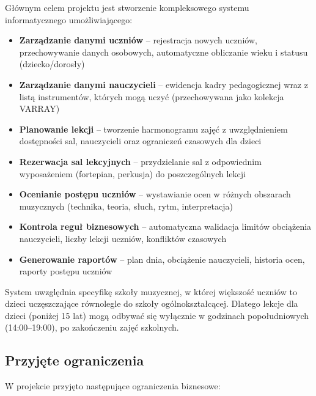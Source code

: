 \documentclass[12pt,a4paper]{article}
\begin{document}
Głównym celem projektu jest stworzenie kompleksowego systemu informatycznego umożliwiającego:

\begin{itemize}
    \item \textbf{Zarządzanie danymi uczniów} -- rejestracja nowych uczniów, przechowywanie danych osobowych, automatyczne obliczanie wieku i statusu (dziecko/dorosły)

    \item \textbf{Zarządzanie danymi nauczycieli} -- ewidencja kadry pedagogicznej wraz z listą instrumentów, których mogą uczyć (przechowywana jako kolekcja VARRAY)

    \item \textbf{Planowanie lekcji} -- tworzenie harmonogramu zajęć z uwzględnieniem dostępności sal, nauczycieli oraz ograniczeń czasowych dla dzieci

    \item \textbf{Rezerwacja sal lekcyjnych} -- przydzielanie sal z odpowiednim wyposażeniem (fortepian, perkusja) do poszczególnych lekcji

    \item \textbf{Ocenianie postępu uczniów} -- wystawianie ocen w różnych obszarach muzycznych (technika, teoria, słuch, rytm, interpretacja)

    \item \textbf{Kontrola reguł biznesowych} -- automatyczna walidacja limitów obciążenia nauczycieli, liczby lekcji uczniów, konfliktów czasowych

    \item \textbf{Generowanie raportów} -- plan dnia, obciążenie nauczycieli, historia ocen, raporty postępu uczniów
\end{itemize}

System uwzględnia specyfikę szkoły muzycznej, w której większość uczniów to dzieci uczęszczające równolegle do szkoły ogólnokształcącej. Dlatego lekcje dla dzieci (poniżej 15 lat) mogą odbywać się wyłącznie w godzinach popołudniowych (14:00--19:00), po zakończeniu zajęć szkolnych.

\subsection{Przyjęte ograniczenia}

W projekcie przyjęto następujące ograniczenia biznesowe:
\end{document}
